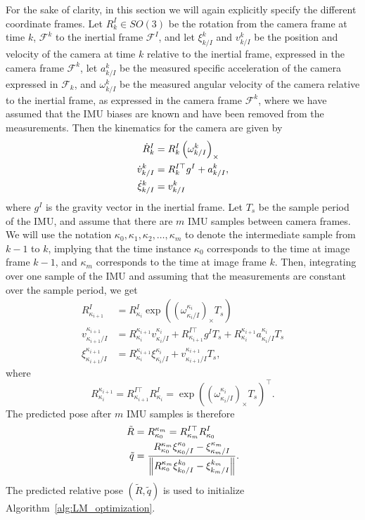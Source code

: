 For the sake of clarity, in this section we will again explicitly specify the different coordinate frames.  Let $R_k^I\in SO(3)$ be the rotation from the camera frame at time $k$, $\mathcal{F}^k$ to the inertial frame $\mathcal{F}^I$, and let $\xi_{k/I}^k$ and $v_{k/I}^k$ be the position and velocity of the camera at time $k$ relative to the inertial frame, expressed in the camera frame $\mathcal{F}^k$, let $a_{k/I}^k$ be the measured specific acceleration of the camera expressed in $\mathcal{F}_k$, and $\omega_{k/I}^k$ be the measured angular velocity of the camera relative to the inertial frame, as expressed in the camera frame $\mathcal{F}^k$, where we have assumed that the IMU biases are known and have been removed from the measurements.  Then the kinematics for the camera are given by
\begin{align}
\dot{R}_k^I &= R_k^I \left(\omega_{k/I}^k\right)_\times \notag \\
\dot{v}_{k/I}^k &= R_k^{I\top} g^I + a_{k/I}^k, \label{eq:kinematics} \\
\dot{\xi}_{k/I}^k &= v_{k/I}^k  \notag
\end{align}
where $g^I$ is the gravity vector in the inertial frame.  Let $T_s$ be the sample period of the IMU, and assume that there are $m$ IMU samples between camera frames.  We will use the notation $\kappa_0, \kappa_1, \kappa_2, \dots, \kappa_m$ to denote the intermediate sample from $k-1$ to $k$, implying that the time instance $\kappa_0$ corresponds to the time at image frame $k-1$, and $\kappa_m$ corresponds to the time at image frame $k$.  Then, integrating over one sample of the IMU and assuming that the measurements are constant over the sample period, we get
\begin{align*}
R_{\kappa_{i+1}}^I &= R_{\kappa_i}^I \exp\left((\omega_{\kappa_i/I}^{\kappa_i})_\times T_s \right) \\
v_{\kappa_{i+1}/I}^{\kappa_{i+1}} &= R_{\kappa_i}^{\kappa_{i+1}}v_{\kappa_i/I}^{\kappa_i} + R_{\kappa_{i+1}}^{I\top} g^I T_s +R_{\kappa_i}^{\kappa_{i+1}} a_{\kappa_i/I}^{\kappa_i} T_s \\
\xi_{\kappa_{i+1}/I}^{\kappa_{i+1}} &= R_{\kappa_i}^{\kappa_{i+1}} \xi_{\kappa_i/I}^{\kappa_i} + v_{\kappa_{i+1}/I}^{\kappa_{i+1}} T_s,
\end{align*}
where 
\[
R_{\kappa_i}^{\kappa_{i+1}} = R_{\kappa_{i+1}}^{I\top} R_{\kappa_i}^I = \exp\left((\omega_{\kappa_i/I}^{\kappa_i})_\times T_s\right)^\top.
\]
The predicted pose after $m$ IMU samples is therefore
\begin{align}
\tilde{R} &= R_{\kappa_0}^{\kappa_m} = R_{\kappa_m}^{I\top} R_{\kappa_0}^I 
\label{eq:Rtilde} \\
\tilde{q} &= \frac{R_{\kappa_0}^{\kappa_m} \xi_{\kappa_0/I}^{\kappa_0} - \xi_{\kappa_m/I}^{\kappa_m}}{\norm{R_{\kappa_0}^{\kappa_m} \xi_{k_0/I}^{k_0} - \xi_{k_m/I}^{k_m}}}.
\label{eq:qtilde}
\end{align}
The predicted relative pose $(\tilde{R}, \tilde{q})$ is used to initialize Algorithm~\ref{alg:LM_optimization}.

